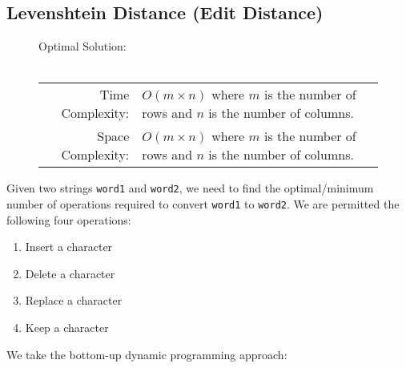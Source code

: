 
\subsection{Levenshtein Distance (Edit Distance)}

\begin{figure}[H]
    Optimal Solution:\\\\
    \begin{tabular}{rl}
        Time Complexity:& \(O(m \times n)\) where \(m\) is the number of rows
        and \(n\) is the number of columns.\\
        Space Complexity:& \(O(m \times n)\) where \(m\) is the number of rows
        and \(n\) is the number of columns.
    \end{tabular}
\end{figure}

Given two strings \texttt{word1} and \texttt{word2}, we
need to find the optimal/minimum number of operations required to convert
\texttt{word1} to \texttt{word2}. We are permitted the
following four operations:

\begin{enumerate}
    \item Insert a character
    \item Delete a character
    \item Replace a character
    \item Keep a character
\end{enumerate}

We take the bottom-up dynamic programming approach:

